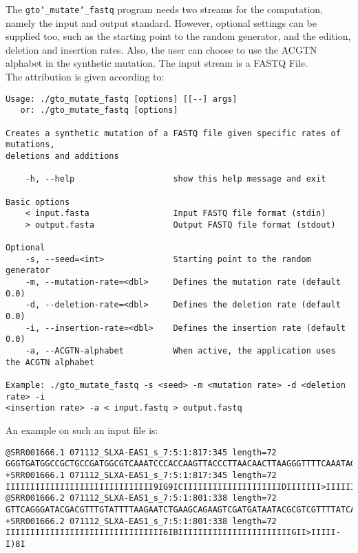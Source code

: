 The \texttt{gto\char`_mutate\char`_fastq} program needs two streams for the computation, namely the input and output standard. However, optional settings can be supplied too, such as the starting point to the random generator, and the edition, deletion and insertion rates. Also, the user can choose to use the ACGTN alphabet in the synthetic mutation. The input stream is a FASTQ File.\\
The attribution is given according to:
\begin{lstlisting}
Usage: ./gto_mutate_fastq [options] [[--] args]
   or: ./gto_mutate_fastq [options]

Creates a synthetic mutation of a FASTQ file given specific rates of mutations,
deletions and additions

    -h, --help                    show this help message and exit

Basic options
    < input.fasta                 Input FASTQ file format (stdin)
    > output.fasta                Output FASTQ file format (stdout)

Optional
    -s, --seed=<int>              Starting point to the random generator
    -m, --mutation-rate=<dbl>     Defines the mutation rate (default 0.0)
    -d, --deletion-rate=<dbl>     Defines the deletion rate (default 0.0)
    -i, --insertion-rate=<dbl>    Defines the insertion rate (default 0.0)
    -a, --ACGTN-alphabet          When active, the application uses the ACGTN alphabet

Example: ./gto_mutate_fastq -s <seed> -m <mutation rate> -d <deletion rate> -i 
<insertion rate> -a < input.fastq > output.fastq

\end{lstlisting}
An example on such an input file is:
\begin{lstlisting}
@SRR001666.1 071112_SLXA-EAS1_s_7:5:1:817:345 length=72
GGGTGATGGCCGCTGCCGATGGCGTCAAATCCCACCAAGTTACCCTTAACAACTTAAGGGTTTTCAAATAGA
+SRR001666.1 071112_SLXA-EAS1_s_7:5:1:817:345 length=72
IIIIIIIIIIIIIIIIIIIIIIIIIIIIII9IG9ICIIIIIIIIIIIIIIIIIIIIDIIIIIII>IIIIII/
@SRR001666.2 071112_SLXA-EAS1_s_7:5:1:801:338 length=72
GTTCAGGGATACGACGTTTGTATTTTAAGAATCTGAAGCAGAAGTCGATGATAATACGCGTCGTTTTATCAT
+SRR001666.2 071112_SLXA-EAS1_s_7:5:1:801:338 length=72
IIIIIIIIIIIIIIIIIIIIIIIIIIIIIIII6IBIIIIIIIIIIIIIIIIIIIIIIIGII>IIIII-I)8I
\end{lstlisting}

